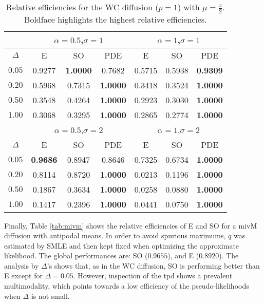 \documentclass[oneside,11pt]{article}
\begin{document}
\begin{table}[H]
\centering
\small
\begin{tabular}{c|ccc||ccc}
\toprule\toprule
& \multicolumn{3}{c||}{$\alpha=0.5$,\quad $\sigma=1$} & \multicolumn{3}{c}{$\alpha=1$,\quad $\sigma=1$} \\ \midrule
$\Delta$ &     E     &    SO     &      PDE      &     E     &    SO     &     PDE     \\ \midrule
$0.05$ &  0.9277 & \bf  1.0000 &  0.7682 &  0.5715 &  0.5938 & \bf  0.9309\\
$0.20$ &  0.5968 &  0.7315 & \bf  1.0000 &  0.3418 &  0.3524 & \bf  1.0000\\
$0.50$ &  0.3548 &  0.4264 & \bf  1.0000 &  0.2923 &  0.3030 & \bf  1.0000\\
$1.00$ &  0.3068 &  0.3295 & \bf  1.0000 &  0.2865 &  0.2774 & \bf  1.0000\\ \midrule\midrule
& \multicolumn{3}{c||}{$\alpha=0.5$,\quad $\sigma=2$} & \multicolumn{3}{c}{$\alpha=1$,\quad $\sigma=2$} \\ \midrule
$\Delta$ &     E     &    SO     &      PDE      &     E     &    SO     &     PDE     \\ \midrule
$0.05$ & \bf  0.9686 &  0.8947 &  0.8646 &  0.7325 &  0.6734 & \bf  1.0000\\
$0.20$ &  0.8114 &  0.8720 & \bf  1.0000 &  0.0213 &  0.1196 & \bf  1.0000\\
$0.50$ &  0.1867 &  0.3634 & \bf  1.0000 &  0.0258 &  0.0880 & \bf  1.0000\\
$1.00$ &  0.1417 &  0.2396 & \bf  1.0000 &  0.0441 &  0.0750 & \bf  1.0000\\ \bottomrule\bottomrule
\end{tabular}
\caption{\small Relative efficiencies for the WC diffusion ($p=1$) with $\mu=\tfrac{\pi}{2}$. Boldface highlights the highest relative efficiencies.\label{tab:wc}}
\end{table}

Finally, Table \ref{tab:mivm} shows the relative efficiencies of E and SO for a mivM diffusion with antipodal means. In order to avoid spurious maximums, $q$ was estimated by SMLE and then kept fixed when optimizing the approximate likelihood. The global performances are: SO ($0.9655$), and E ($0.8920$). The analysis by $\Delta$'s shows that, as in the WC diffusion, SO is performing better than E except for $\Delta=0.05$. However, inspection of the tpd shows a prevalent multimodality, which points towards a low efficiency of the pseudo-likelihoods when $\Delta$ is not small.
\end{document}

